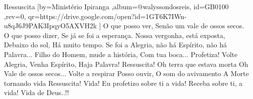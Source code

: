 \beginsong
{Ressuscita %
}[by={Ministério Ipiranga %
},album={@walyssondosreis},
id={GB0100 %
},rev={0}, %
qr={https://drive.google.com/open?id=1GT6K7IWn-u8qJ6J9PAK3IpqyO5AXVH2k %
}]
\beginverse*
O que posso ver,
Senão um vale de ossos secos.
O que posso dizer,
Se já se foi a esperança.
Nossa vergonha, está exposta,
Debaixo do sol, Há muito tempo.
Se foi a Alegria, não há Espírito, não há Palavra...
\endverse
\beginverse*
Filho do Homem, mude a história,
Com tua boca...
Profetiza!
Volte Alegria, Venha Espírito, Haja Palavra!
\endverse
\beginchorus
Ressuscita!
Oh terra que estava morta
Oh Vale de ossos secos...
Volte a respirar
Posso ouvir,
O som do avivamento
A Morte tornando vida
Ressuscita!
\endchorus
\beginverse*
Vida! Eu profetizo sobre ti a vida!
Receba sobre ti, a vida!
Vida de Deus..!!
\endverse


